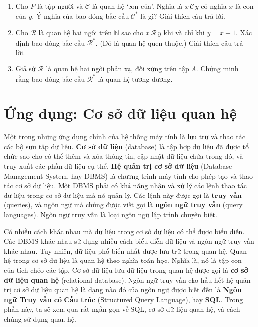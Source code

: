 \begin{enumerate}
\item[10.] Cho $P$ là tập người và $\mathcal{C}$ là quan hệ `con của'. Nghĩa là $x\,\mathcal{C}\,y$ có nghĩa $x$ là con của $y$. Ý nghĩa của bao đóng bắc cầu $\mathcal{C}^*$ là gì? Giải thích câu trả lời.

\item[11.] Cho $\mathcal{R}$ là quan hệ hai ngôi trên $\mathbb{N}$ sao cho $x\,\mathcal{R}\,y$ khi và chỉ khi $y = x + 1$. Xác định bao đóng bắc cầu $\mathcal{R}^*$. (Đó là quan hệ quen thuộc.) Giải thích câu trả lời.

\item[12.] Giả sử $\mathcal{R}$ là quan hệ hai ngôi phản xạ, đối xứng trên tập $A$. Chứng minh rằng bao đóng bắc cầu $\mathcal{R}^*$ là quan hệ tương đương.
\end{enumerate}

\section{Ứng dụng: Cơ sở dữ liệu quan hệ}

Một trong những ứng dụng chính của hệ thống máy tính là lưu trữ và thao tác các bộ sưu tập dữ liệu. \textbf{Cơ sở dữ liệu} (database) là tập hợp dữ liệu đã được tổ chức sao cho có thể thêm và xóa thông tin, cập nhật dữ liệu chứa trong đó, và truy xuất các phần dữ liệu cụ thể. \textbf{Hệ quản trị cơ sở dữ liệu} (Database Management System, hay DBMS) là chương trình máy tính cho phép tạo và thao tác cơ sở dữ liệu. Một DBMS phải có khả năng nhận và xử lý các lệnh thao tác dữ liệu trong cơ sở dữ liệu mà nó quản lý. Các lệnh này được gọi là \textbf{truy vấn} (queries), và ngôn ngữ mà chúng được viết gọi là \textbf{ngôn ngữ truy vấn} (query languages). Ngôn ngữ truy vấn là loại ngôn ngữ lập trình chuyên biệt.

Có nhiều cách khác nhau mà dữ liệu trong cơ sở dữ liệu có thể được biểu diễn. Các DBMS khác nhau sử dụng nhiều cách biểu diễn dữ liệu và ngôn ngữ truy vấn khác nhau. Tuy nhiên, dữ liệu phổ biến nhất được lưu trữ trong quan hệ. Quan hệ trong cơ sở dữ liệu là quan hệ theo nghĩa toán học. Nghĩa là, nó là tập con của tích chéo các tập. Cơ sở dữ liệu lưu dữ liệu trong quan hệ được gọi là \textbf{cơ sở dữ liệu quan hệ} (relational database). Ngôn ngữ truy vấn cho hầu hết hệ quản trị cơ sở dữ liệu quan hệ là dạng nào đó của ngôn ngữ được biết đến là \textbf{Ngôn ngữ Truy vấn có Cấu trúc} (Structured Query Language), hay \textbf{SQL}. Trong phần này, ta sẽ xem qua rất ngắn gọn về SQL, cơ sở dữ liệu quan hệ, và cách chúng sử dụng quan hệ.

